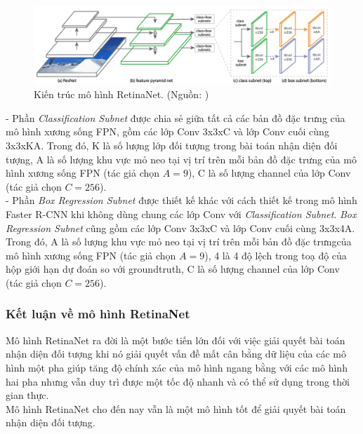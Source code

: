 {    \begin{figure}[H]
        \centering
        \includegraphics[width=14cm] {images/retinanet_model}
        \caption{Kiến trúc mô hình RetinaNet. (Nguồn: \cite{lin2017focal})}
        \label{fig:retinanet_model}
    \end{figure}

    \noindent
    - Phần \textit{Classification Subnet} được chia sẻ giữa tất cả các bản đồ đặc trưng của mô hình xương sống FPN, gồm các lớp Conv 3x3xC và lớp Conv cuối cùng 3x3xKA.
    Trong đó, K là số lượng lớp đối tượng trong bài toán nhận diện đối tượng, A là số lượng khu vực mỏ neo tại vị trí trên mỗi bản đồ đặc trưng của mô hình xương sống FPN (tác giả chọn $A = 9$), C là số lượng channel của lớp Conv (tác giả chọn $C = 256$). \\
    - Phần \textit{Box Regression Subnet} được thiết kế khác với cách thiết kế trong mô hình Faster R-CNN \cite{ren2015faster} khi không dùng chung các lớp Conv với \textit{Classification Subnet}.
    \textit{Box Regression Subnet} cũng gồm các lớp Conv 3x3xC và lớp Conv cuối cùng 3x3x4A.
    Trong đó, A là số lượng khu vực mỏ neo tại vị trí trên mỗi bản đồ đặc trưngcủa mô hình xương sống FPN (tác giả chọn $A = 9$), 4 là 4 độ lệch trong toạ độ của hộp giới hạn dự đoán so với groundtruth, C là số lượng channel của lớp Conv (tác giả chọn $C = 256$).

    \subsubsection*{Kết luận về mô hình RetinaNet}
    Mô hình RetinaNet ra đời là một bước tiến lớn đối với việc giải quyết bài toán nhận diện đối tượng khi nó giải quyết vấn đề mất cân bằng dữ liệu của các mô hình một pha giúp tăng độ chính xác của mô hình ngang bằng với các mô hình hai pha nhưng vẫn duy trì được một tốc độ nhanh và có thể sử dụng trong thời gian thực. \\
    Mô hình RetinaNet cho đến nay vẫn là một mô hình tốt để giải quyết bài toán nhận diện đối tượng.
}